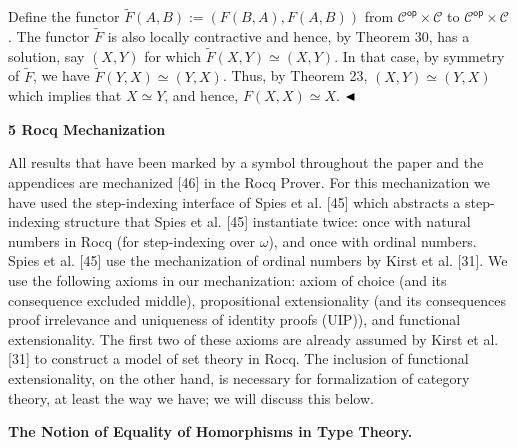 Define the functor $\tilde{F}(A,B):=(F(B,A),F(A,B))$ from ${\mathcal{C}}^{\mathsf{op}}\times\mathcal{C}$ to ${\mathcal{C}}^{\mathsf{op}}\times\mathcal{C}$. The functor $\tilde{F}$ is also locally contractive and hence, by Theorem 30, has a solution, say $(X,Y)$ for which $\tilde{F}(X,Y)\simeq(X,Y)$. In that case, by symmetry of $\tilde{F}$, we have $\tilde{F}(Y,X)\simeq(Y,X)$. Thus, by Theorem 23, $(X,Y)\simeq(Y,X)$ which implies that $X\simeq Y$, and hence, $F(X,X)\simeq X$. $\hfill\blacktriangleleft$\par
 
 
 
 


 
\par\medskip\noindent\textbf{5 Rocq Mechanization}\par
 
 
All results that have been marked by a  symbol throughout the paper and the appendices are mechanized [46] in the Rocq Prover. For this mechanization we have used the step-indexing interface of Spies et al. [45] which abstracts a step-indexing structure that Spies et al. [45] instantiate twice: once with natural numbers in Rocq (for step-indexing over $\omega$), and once with ordinal numbers. Spies et al. [45] use the mechanization of ordinal numbers by Kirst et al. [31]. We use the following axioms in our mechanization: axiom of choice (and its consequence excluded middle), propositional extensionality (and its consequences proof irrelevance and uniqueness of identity proofs (UIP)), and functional extensionality. The first two of these axioms are already assumed by Kirst et al. [31] to construct a model of set theory in Rocq. The inclusion of functional extensionality, on the other hand, is necessary for formalization of category theory, at least the way we have; we will discuss this below.\par
 
 
 
\par\medskip\noindent\textbf{The Notion of Equality of Homorphisms in Type Theory.}\par
 
 
